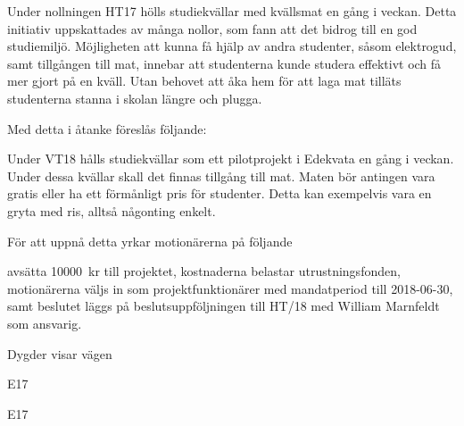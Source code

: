 \documentclass[../_main/handlingar.tex]{subfiles}
\begin{document}
Under nollningen HT17 hölls studiekvällar med kvällsmat en gång i veckan. Detta initiativ uppskattades av många nollor, som fann att det bidrog till en god studiemiljö. Möjligheten att kunna få hjälp av andra studenter, såsom elektrogud, samt tillgången till mat, innebar att studenterna
kunde studera effektivt och få mer gjort på en kväll. Utan behovet att åka hem för att laga mat tilläts studenterna stanna i skolan längre och plugga.

Med detta i åtanke föreslås följande:

Under VT18 hålls studiekvällar som ett pilotprojekt i Edekvata en gång i veckan. Under dessa kvällar skall det finnas tillgång till mat. Maten bör antingen vara gratis eller ha ett förmånligt pris för
studenter. Detta kan exempelvis vara en gryta med ris, alltså någonting enkelt.

För att uppnå detta yrkar motionärerna på följande

\begin{attsatser}
  \att avsätta \SI{10000}{kr} till projektet,
  \att kostnaderna belastar utrustningsfonden,
  \att motionärerna väljs in som projektfunktionärer med mandatperiod till 2018-06-30, samt
  \att beslutet läggs på beslutsuppföljningen till HT/18 med William Marnfeldt som ansvarig.
\end{attsatser}

\begin{signatures}{2}
    Dygder visar vägen
    \signature{William Marnfeldt}{E17}
    \signature{Filip Larsson}{E17}
\end{signatures}
\end{document}
